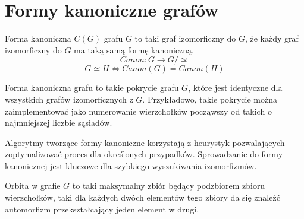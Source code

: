   \section{Formy kanoniczne grafów}

  \begin{definition}
    Forma kanoniczna $C(G)$ grafu $G$ to taki graf izomorficzny do $G$, że każdy graf izomorficzny do $G$ ma taką samą formę kanoniczną\cite{canon}. 
    $$ Canon \colon G \to G / \simeq $$
    $$G \simeq H \iff Canon(G) = Canon(H) $$
  \end{definition}

  Forma kanoniczna grafu to takie pokrycie grafu $G$, 
  które jest identyczne dla wszystkich grafów izomorficznych z $G$. Przykładowo, takie pokrycie można zaimplementować
   jako numerowanie wierzchołków począwszy od takich o najmniejszej liczbie sąsiadów. 


  
Algorytmy tworzące formy kanoniczne korzystają z  heurystyk pozwalających zoptymalizować proces dla określonych przypadków\cite{canon}.  Sprowadzanie do formy kanonicznej jest kluczowe dla szybkiego wyszukiwania izomorfizmów.
%
 

\begin{definition}[Orbita]
  Orbita w grafie $G$ to taki maksymalny zbiór będący podzbiorem zbioru wierzchołków, taki dla każdych dwóch elementów tego zbiory da się znaleźć automorfizm przekształcający jeden element w drugi.
\end{definition}

